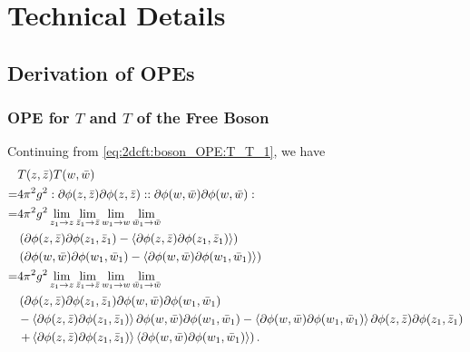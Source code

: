 \documentclass[10pt]{article}
\begin{document}
\section{Technical Details}
\subsection{Derivation of OPEs}
\subsubsection{OPE for \texorpdfstring{$T$}{T} and \texorpdfstring{$T$}{T} of the Free Boson\label{appendix:deriva_OPE:boson_T_T}}
Continuing from \cref{eq:2dcft:boson_OPE:T_T_1}, we have
\begin{align}
      & T(z,\bar{z})T(w,\bar{w})\notag                                                                                                                                                                                                     \\
    = & 4\pi^2 g^2:\partial\phi(z,\bar{z})\partial\phi(z,\bar{z})::\partial\phi(w,\bar{w})\partial\phi(w,\bar{w}):\notag                                                                                                                   \\
    = & 4\pi^2 g^2\lim_{z_1\to z}\lim_{\bar{z}_1\to\bar{z}}\lim_{w_1\to w}\lim_{\bar{w}_1\to\bar{w}}\notag                                                                                                                                 \\
      & \left(\partial\phi(z,\bar{z})\partial\phi(z_1,\bar{z}_1)-\expval{\partial\phi(z,\bar{z})\partial\phi(z_1,\bar{z}_1)}\right)\notag                                                                                                  \\
      & \left(\partial\phi(w,\bar{w})\partial\phi(w_1,\bar{w}_1)-\expval{\partial\phi(w,\bar{w})\partial\phi(w_1,\bar{w}_1)}\right)\notag                                                                                                  \\
    = & 4\pi^2 g^2\lim_{z_1\to z}\lim_{\bar{z}_1\to\bar{z}}\lim_{w_1\to w}\lim_{\bar{w}_1\to\bar{w}}\notag                                                                                                                                 \\
      & \left(\partial\phi(z,\bar{z})\partial\phi(z_1,\bar{z}_1)\partial\phi(w,\bar{w})\partial\phi(w_1,\bar{w}_1)\right.\notag                                                                                                            \\
      & -\expval{\partial\phi(z,\bar{z})\partial\phi(z_1,\bar{z}_1)}\partial\phi(w,\bar{w})\partial\phi(w_1,\bar{w}_1)-\expval{\partial\phi(w,\bar{w})\partial\phi(w_1,\bar{w}_1)}\partial\phi(z,\bar{z})\partial\phi(z_1,\bar{z}_1)\notag \\
      & \left.+\expval{\partial\phi(z,\bar{z})\partial\phi(z_1,\bar{z}_1)}\expval{\partial\phi(w,\bar{w})\partial\phi(w_1,\bar{w}_1)}\right).\label{eq:app:OPE:boson:TT:1}
\end{align}
\end{document}
